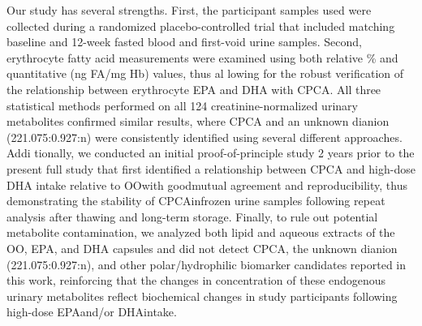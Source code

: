 \documentclass[journal=jacsat,manuscript=article]{achemso}
\begin{document}
Our study has several strengths. First, the participant samples used
were collected during a randomized placebo-controlled trial that
included matching baseline and 12-week fasted blood and first-void urine
samples. Second, erythrocyte fatty acid measurements were examined using
both relative \% and quantitative (ng FA/mg Hb) values, thus al lowing
for the robust verification of the relationship between erythrocyte EPA
and DHA with CPCA. All three statistical methods performed on all 124
creatinine-normalized urinary metabolites confirmed similar results,
where CPCA and an unknown dianion (221.075:0.927:n) were consistently
identified using several different approaches. Addi tionally, we
conducted an initial proof-of-principle study 2 years prior to the
present full study that first identified a relationship between CPCA and
high-dose DHA intake relative to OOwith goodmutual agreement and
reproducibility, thus demonstrating the stability of CPCAinfrozen urine
samples following repeat analysis after thawing and long-term storage.
Finally, to rule out potential metabolite contamination, we analyzed
both lipid and aqueous extracts of the OO, EPA, and DHA capsules and did
not detect CPCA, the unknown dianion (221.075:0.927:n), and other
polar/hydrophilic biomarker candidates reported in this work,
reinforcing that the changes in concentration of these endogenous
urinary metabolites reflect biochemical changes in study participants
following high-dose EPAand/or DHAintake.
\end{document}
